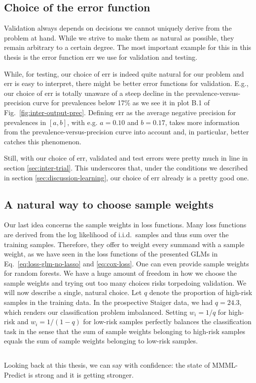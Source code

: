 \subsection{Choice of the error function}

Validation always depends on decisions we cannot uniquely derive from the problem at hand. 
While we strive to make them as natural as possible, they remain arbitrary to a certain degree. 
The most important example for this in this thesis is the error function $\text{err}$ we use for 
validation and testing.

While, for testing, our choice of $\text{err}$ is indeed quite natural for our problem and 
$\text{err}$ is easy to interpret, there might be better error functions for validation. E.g., our 
choice of $\text{err}$ is totally unaware of a steep decline in the prevalence-versus-precision 
curve for prevalences below \num{17}\% as we see it in plot B.1 of Fig.\ \ref{fig:inter-output-prec}. 
Defining $\text{err}$ as the average negative precision for prevalences in $[a, b]$, with e.g. 
$a = \num{0.10}$ and $b = \num{0.17}$, takes more information from the prevalence-versus-precision 
curve into account and, in particular, better catches this phenomenon.

Still, with our choice of $\text{err}$, validated and test errors were pretty much in line in 
section \ref{sec:inter-trial}. This underscores that, under the conditions we described in 
section \ref{sec:discussion-learning}, our choice of $\text{err}$ already is a pretty good one.

\subsection{A natural way to choose sample weights}

Our last idea concerns the sample weights in loss functions. Many loss functions are derived 
from the log likelihood of i.i.d.\ samples and thus sum over the training samples. Therefore, they 
offer to weight every summand with a sample weight, as we have seen in the loss functions of the 
presented GLMs in Eq.\ \eqref{eq:loss-glm-no-lasso} and \eqref{eq:cox-loss}. One can even provide 
sample weights for random forests. We have a huge amount of 
freedom in how we choose the sample weights and trying out too many choices risks torpedoing 
validation. We will now describe a single, natural choice. Let $q$ denote the 
proportion of high-risk samples in the training data. In the prospective Staiger data, we had 
$q = \num{24.3}$, which renders our classification problem imbalanced. Setting $w_i = 1/q$ for 
high-risk and $w_i = 1/(1-q)$ for low-risk samples perfectly balances the classification task in 
the sense that the sum of sample weights belonging to high-risk samples equals the sum of sample 
weights belonging to low-risk samples.

\subsection*{}
Looking back at this thesis, we can say with confidence: the state of MMML-Predict is strong and 
it is getting stronger.